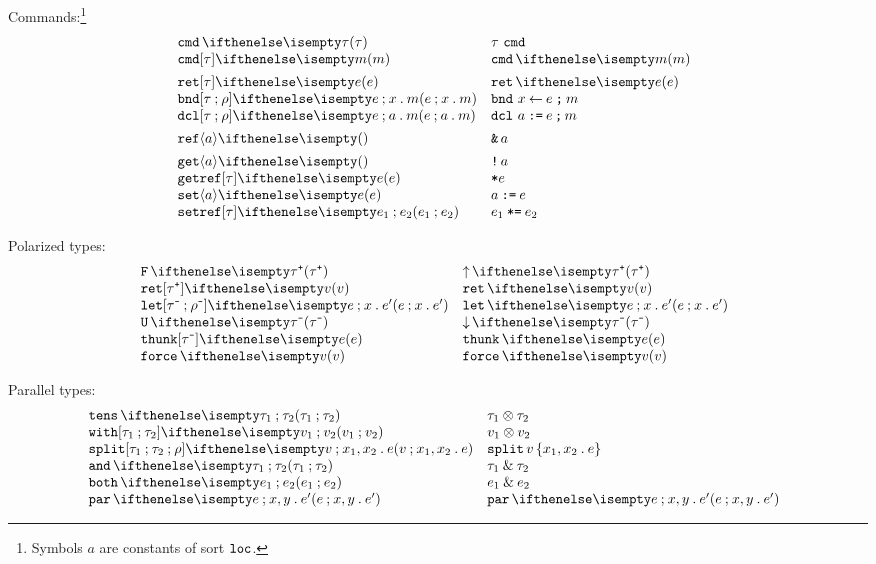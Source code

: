 \documentclass[11pt,twoside]{article}
\begin{document}
\noindent Commands:\footnote{Symbols $a$ are constants of sort $\texttt{loc}$.}
\begin{displaymath}
  \begin{array}{l@{\quad}l@{\quad}l}
    \cmdTy{\tau}  & \cmdTy*{\tau} \\
    \cmdEx[\tau]{m} & \cmdEx*{m} \\[1ex]
    \retCmd[\tau]{e} & \retCmd*{e} \\
    \bndCmd{e}{x}{m} & \bndCmd*{e}{x}{m} \\
    \dclCmd{e}{a}{m} & \dclCmd*{e}{a}{m} \\[1ex]
    \refEx{a} & \refEx*{a} \\[1ex]
    \getCmd{a} & \getCmd*{a} \\
    \getrefCmd[\tau]{e} & \getrefCmd*{e} \\
    \setCmd{a}{e} & \setCmd*{a}{e} \\
    \setrefCmd[\tau]{e_1}{e_2} & \setrefCmd*[\tau]{e_1}{e_2}
 \end{array}
\end{displaymath}

\noindent Polarized types:
\begin{displaymath}
  \begin{array}{l@{\quad}l@{\quad}l}
    \freeTy{\posTy{\tau}}   & \freeTy*{\posTy{\tau}} \\
    \freeEx[\posTy{\tau}]{v} & \freeEx*[\posTy{\tau}]{v} \\
    \fletEx[\negTy{\tau}][\negTy{\rho}]{e}{x}{e'} & \fletEx*{e}{x}{e'} \\
    \thunkTy{\negTy{\tau}}  & \thunkTy*{\negTy{\tau}} \\
    \thunkEx[\negTy{\tau}]{e} & \thunkEx*{e} \\
    \forceEx{v}   & \forceEx*{v}
  \end{array}
\end{displaymath}

\noindent Parallel types:
\begin{displaymath}
  \begin{array}{l@{\quad}l@{\quad}l}
    \tensorTy{\tau_1}{\tau_2} & \tensorTy*{\tau_1}{\tau_2} \\
    \tensorEx{v_1}{v_2} & \tensorEx*{v_1}{v_2} \\
    \splitEx{v}{x_1}{x_2}{e} & \splitEx*{v}{x_1}{x_2}{e} \\
    \bothTy{\tau_1}{\tau_2} & \bothTy*{\tau_1}{\tau_2} \\
    \bothEx{e_1}{e_2} & \bothEx*{e_1}{e_2} \\
    \parEx{e}{x}{y}{e'} & \parEx*{e}{x}{y}{e'}
  \end{array}
\end{displaymath}
\end{document}

